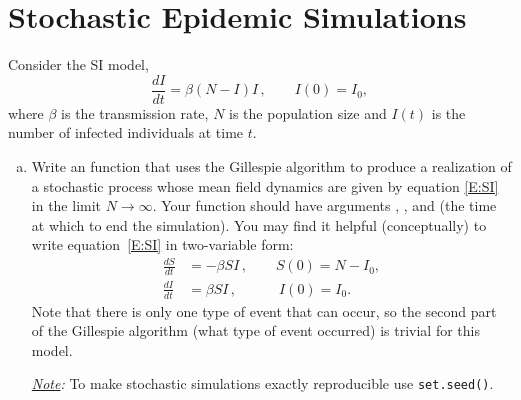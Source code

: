 \documentclass[12pt]{article}\usepackage[]{graphicx}\usepackage[]{color}
\begin{document}
\section{Stochastic Epidemic Simulations}

Consider the SI model,
%
\begin{equation}\label{E:SI}
  \frac{dI}{dt} = \beta (N-I) I \,, \qquad I(0)=I_0,
\end{equation}
%
where $\beta$ is the transmission rate, $N$ is the population size and
$I(t)$ is the number of infected individuals at time $t$.

\begin{enumerate}[(a)]

\item Write an \Rlogo function  that uses the
  Gillespie algorithm to produce a realization of a stochastic process
  whose mean field dynamics are given by equation \eqref{E:SI} in the
  limit $N\to\infty$.  Your function should have arguments
  , ,  and  (the time at which
  to end the simulation).  You may find it helpful (conceptually) to write
  equation~\eqref{E:SI} in two-variable form:
  \begin{subequations}
    \begin{align}
      \frac{dS}{dt} &= -\beta S I \,, \qquad S(0)=N-I_0, \\
      \frac{dI}{dt} &= \beta S I \,, \qquad\quad I(0)=I_0.
    \end{align}
  \end{subequations}
  Note that there is only one type of event that can occur, so the second part of the Gillespie algorithm (what type of event occurred) is trivial for this model.
  
\emph{\underline{Note}:} To make stochastic simulations exactly reproducible use \texttt{\color{magenta}set.seed()}.


\end{enumerate}
\end{document}
